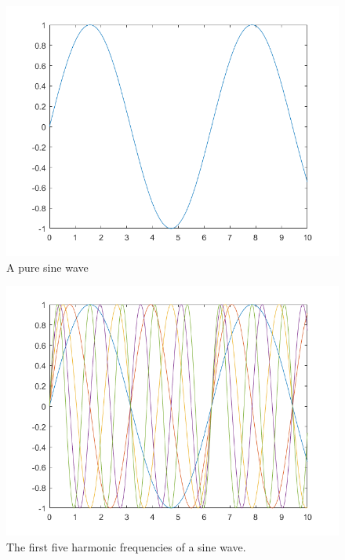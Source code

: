 \begin{figure}
	\centering
	\includegraphics[width=\textwidth]{../figures/sinWave.png}
	\caption{A pure sine wave}
	\label{fig:sin}
\end{figure}

\begin{figure}
	\centering
	\includegraphics[width=\textwidth]{../figures/harmonicSinWaves.png}
	\caption{The first five harmonic frequencies of a sine wave.}
	\label{fig:harmonics}
\end{figure}

